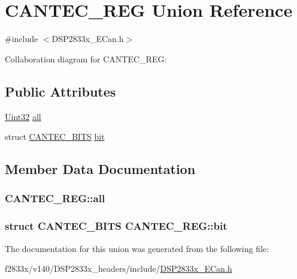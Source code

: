 \hypertarget{union_c_a_n_t_e_c___r_e_g}{}\section{C\+A\+N\+T\+E\+C\+\_\+\+R\+E\+G Union Reference}
\label{union_c_a_n_t_e_c___r_e_g}


{\ttfamily \#include $<$D\+S\+P2833x\+\_\+\+E\+Can.\+h$>$}



Collaboration diagram for C\+A\+N\+T\+E\+C\+\_\+\+R\+E\+G\+:
\subsection*{Public Attributes}
\begin{DoxyCompactItemize}
\item 
\hyperlink{_d_s_p2833x___device_8h_aba99025e657f892beb7ff31cecf64653}{Uint32} \hyperlink{union_c_a_n_t_e_c___r_e_g_a460d1fd07d0ad2c79397f6165bd7fd4f}{all}
\item 
struct \hyperlink{struct_c_a_n_t_e_c___b_i_t_s}{C\+A\+N\+T\+E\+C\+\_\+\+B\+I\+T\+S} \hyperlink{union_c_a_n_t_e_c___r_e_g_ab5eb2ad42e84d4273be5bd3cef077640}{bit}
\end{DoxyCompactItemize}


\subsection{Member Data Documentation}
\hypertarget{union_c_a_n_t_e_c___r_e_g_a460d1fd07d0ad2c79397f6165bd7fd4f}{}
\subsubsection[{all}]{ C\+A\+N\+T\+E\+C\+\_\+\+R\+E\+G\+::all}\label{union_c_a_n_t_e_c___r_e_g_a460d1fd07d0ad2c79397f6165bd7fd4f}
\hypertarget{union_c_a_n_t_e_c___r_e_g_ab5eb2ad42e84d4273be5bd3cef077640}{}
\subsubsection[{bit}]{\setlength{\rightskip}{0pt plus 5cm}struct {\bf C\+A\+N\+T\+E\+C\+\_\+\+B\+I\+T\+S} C\+A\+N\+T\+E\+C\+\_\+\+R\+E\+G\+::bit}\label{union_c_a_n_t_e_c___r_e_g_ab5eb2ad42e84d4273be5bd3cef077640}


The documentation for this union was generated from the following file\+:\begin{DoxyCompactItemize}
\item 
f2833x/v140/\+D\+S\+P2833x\+\_\+headers/include/\hyperlink{_d_s_p2833x___e_can_8h}{D\+S\+P2833x\+\_\+\+E\+Can.\+h}\end{DoxyCompactItemize}
